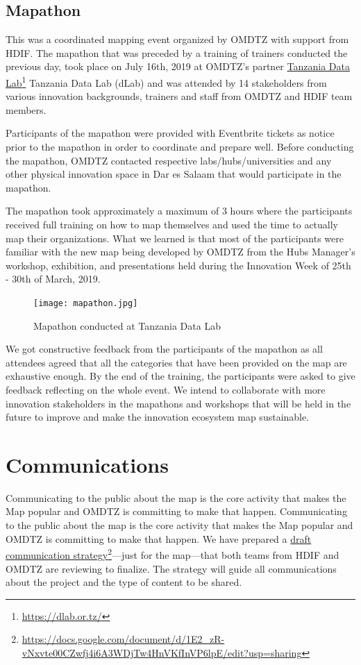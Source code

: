 \documentclass[a4paper,12pt,twoside]{article}
\begin{document}
\subsection{Mapathon}
This was a coordinated mapping event organized by OMDTZ with support from HDIF. The mapathon that was preceded by a training of trainers conducted the previous day, took place on July 16th, 2019 at OMDTZ’s partner \href{https://dlab.or.tz/}{Tanzania Data Lab}\footnote{\url{https://dlab.or.tz/}} Tanzania Data Lab (dLab) and was attended by 14 stakeholders from various innovation backgrounds, trainers and staff from OMDTZ and HDIF team members.

Participants of the mapathon were provided with Eventbrite tickets as notice prior to the mapathon in order to coordinate and prepare well. Before conducting the mapathon, OMDTZ contacted respective labs/hubs/universities and any other physical innovation space in Dar es Salaam that would participate in the mapathon.

The mapathon took approximately a maximum of 3 hours where the participants received full training on how to map themselves and used the time to actually map their organizations. What we learned is that most of the participants were familiar with the new map being developed by OMDTZ from the Hubs Manager’s workshop, exhibition, and presentations held during the Innovation Week of 25th - 30th of March, 2019.  

\begin{figure}%
	\centering
	\caption{Mapathon conducted at Tanzania Data Lab}
	\texttt{[image: mapathon.jpg]}
\end{figure}

We got constructive feedback from the participants of the mapathon as all attendees agreed that all the categories that have been provided on the map are exhaustive enough. By the end of the training, the participants were asked to give feedback reflecting on the whole event. We intend to collaborate with more innovation stakeholders in the mapathons and workshops that will be held in the future to improve and make the innovation ecosystem map sustainable.

\section{Communications}
Communicating to the public about the map is the core activity that makes the Map popular and OMDTZ is committing to make that happen. Communicating to the public about the map is the core activity that makes the Map popular and OMDTZ is committing to make that happen. We have prepared a \href{https://docs.google.com/document/d/1E2_zR-vNxvte00CZwfj4i6A3WDjTw4HnVKfInVP6lpE/edit?usp=sharing}{draft communication strategy}\footnote{\url{https://docs.google.com/document/d/1E2_zR-vNxvte00CZwfj4i6A3WDjTw4HnVKfInVP6lpE/edit?usp=sharing}}---just for the map---that both teams from HDIF and OMDTZ are reviewing to finalize. The strategy will guide all communications about the project and the type of content to be shared.
\end{document}
